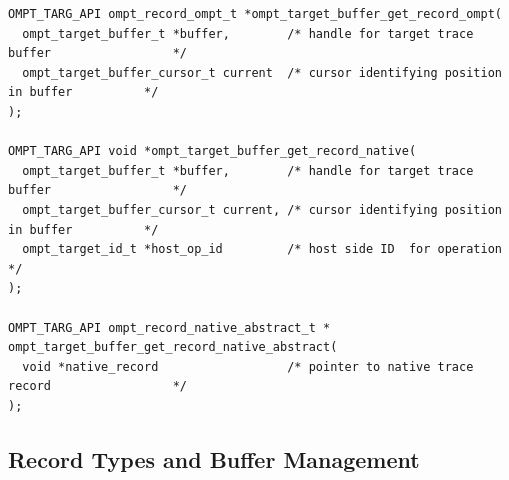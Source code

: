 \documentclass{article}
\begin{document}
\begin{verbatim}
OMPT_TARG_API ompt_record_ompt_t *ompt_target_buffer_get_record_ompt(
  ompt_target_buffer_t *buffer,        /* handle for target trace buffer                 */
  ompt_target_buffer_cursor_t current  /* cursor identifying position in buffer          */
);
   
OMPT_TARG_API void *ompt_target_buffer_get_record_native(
  ompt_target_buffer_t *buffer,        /* handle for target trace buffer                 */
  ompt_target_buffer_cursor_t current, /* cursor identifying position in buffer          */
  ompt_target_id_t *host_op_id         /* host side ID  for operation                    */
);
  
OMPT_TARG_API ompt_record_native_abstract_t *
ompt_target_buffer_get_record_native_abstract(
  void *native_record                  /* pointer to native trace record                 */
);
\end{verbatim}

\clearpage  
\subsection{Record Types and Buffer Management}
\label{appendix:ompt-records}
\end{document}

